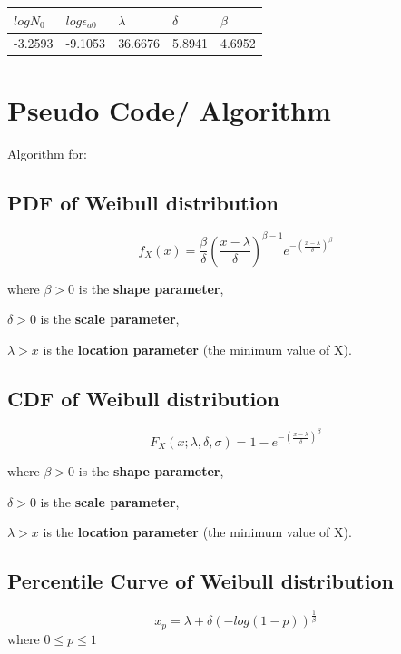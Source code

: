 \documentclass[11pt]{article}
\begin{document}
\begin{longtable}[]{@{}lllll@{}}
\toprule
\(logN_0\) & \(log\epsilon_{a0}\) & \(\lambda\) & \(\delta\) &
\(\beta\)\tabularnewline
\midrule
\endhead
-3.2593 & -9.1053 & 36.6676 & 5.8941 & 4.6952\tabularnewline
\bottomrule
\end{longtable}

\hypertarget{pseudo-code-algorithm}{%
\section{Pseudo Code/ Algorithm}\label{pseudo-code-algorithm}}

Algorithm for:

\hypertarget{pdf-of-weibull-distribution}{%
\subsection{PDF of Weibull
distribution}\label{pdf-of-weibull-distribution}}

\[
f_X(x) = 
\frac{\beta}{\delta}(\frac{x-\lambda}{\delta})^{\beta-1}e^{-(\frac{x-\lambda}{\delta})^\beta}
\]

where \(\beta > 0\) is the \textbf{shape parameter},

\(\delta > 0\) is the \textbf{scale parameter},

\(\lambda > x\) is the \textbf{location parameter} (the minimum value of
X).

\hypertarget{cdf-of-weibull-distribution}{%
\subsection{CDF of Weibull
distribution}\label{cdf-of-weibull-distribution}}

\[
F_X(x;\lambda,\delta,\sigma) = 1-e^{-({\frac{x-\lambda}{\delta}})^\beta}
\]

where \(\beta > 0\) is the \textbf{shape parameter},

\(\delta > 0\) is the \textbf{scale parameter},

\(\lambda > x\) is the \textbf{location parameter} (the minimum value of
X).

\hypertarget{percentile-curve-of-weibull-distribution}{%
\subsection{Percentile Curve of Weibull
distribution}\label{percentile-curve-of-weibull-distribution}}

\[
x_p = \lambda + \delta(-log(1-p))^{\frac{1}{\beta}}
\] where \(0\leq p\leq 1\)
\end{document}
